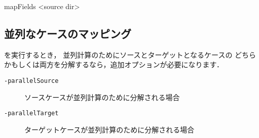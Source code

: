 \begin{OFverbatim}[terminal]
mapFields <source dir>
\end{OFverbatim}


\subsection{並列なケースのマッピング}
\label{ssec:5.6.3}
を実行するとき，
並列計算のためにソースとターゲットとなるケースの
どちらかもしくは両方を分解するなら，追加オプションが必要になります．
\begin{description}
 \item[\texttt{-parallelSource}] ソースケースが並列計算のために分解される場合
 \item[\texttt{-parallelTarget}] ターゲットケースが並列計算のために分解される場合
\end{description}
